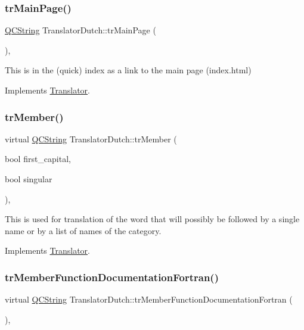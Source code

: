 \subsubsection{\texorpdfstring{trMainPage()}{trMainPage()}}
{\footnotesize\ttfamily \mbox{\hyperlink{class_q_c_string}{Q\+C\+String}} Translator\+Dutch\+::tr\+Main\+Page (\begin{DoxyParamCaption}{ }\end{DoxyParamCaption})\hspace{0.3cm}{\ttfamily [inline]}, {\ttfamily [virtual]}}

This is in the (quick) index as a link to the main page (index.\+html) 

Implements \mbox{\hyperlink{class_translator}{Translator}}.

\mbox{\label{class_translator_dutch_a2a80b7a963cbeea8ffdc12831224f164}} 
\subsubsection{\texorpdfstring{trMember()}{trMember()}}
{\footnotesize\ttfamily virtual \mbox{\hyperlink{class_q_c_string}{Q\+C\+String}} Translator\+Dutch\+::tr\+Member (\begin{DoxyParamCaption}\item[{bool}]{first\+\_\+capital,  }\item[{bool}]{singular }\end{DoxyParamCaption})\hspace{0.3cm}{\ttfamily [inline]}, {\ttfamily [virtual]}}

This is used for translation of the word that will possibly be followed by a single name or by a list of names of the category. 

Implements \mbox{\hyperlink{class_translator}{Translator}}.

\mbox{\label{class_translator_dutch_a063a80a4af626566a7207db935895d63}} 
\subsubsection{\texorpdfstring{trMemberFunctionDocumentationFortran()}{trMemberFunctionDocumentationFortran()}}
{\footnotesize\ttfamily virtual \mbox{\hyperlink{class_q_c_string}{Q\+C\+String}} Translator\+Dutch\+::tr\+Member\+Function\+Documentation\+Fortran (\begin{DoxyParamCaption}{ }\end{DoxyParamCaption})\hspace{0.3cm}{\ttfamily [inline]}, {\ttfamily [virtual]}}

